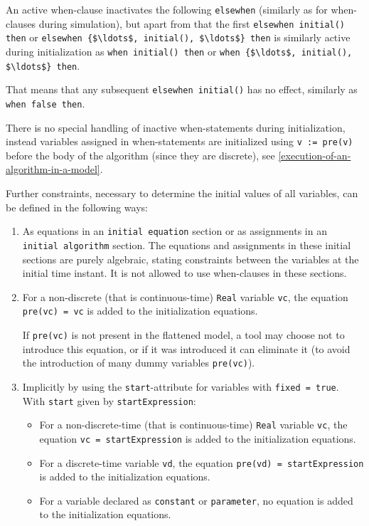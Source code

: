 An active when-clause inactivates the following \lstinline!elsewhen! (similarly as for when-clauses during simulation), but apart from that
the first \lstinline!elsewhen initial() then! or \lstinline!elsewhen {$\ldots$, initial(), $\ldots$} then! is similarly active during initialization as
\lstinline!when initial() then! or \lstinline!when {$\ldots$, initial(), $\ldots$} then!.

\begin{nonnormative}
That means that any subsequent \lstinline!elsewhen initial()! has no effect,
similarly as \lstinline!when false then!.
\end{nonnormative}

\begin{nonnormative}
There is no special handling of inactive when-statements during initialization, instead
variables assigned in when-statements are initialized using \lstinline!v := pre(v)!
before the body of the algorithm (since they are discrete), see \cref{execution-of-an-algorithm-in-a-model}.
\end{nonnormative}

Further constraints, necessary to determine the initial values of all
variables, can be defined in the following ways:
\begin{enumerate}
\item
  As equations in an \lstinline!initial equation! section or as assignments in an \lstinline!initial algorithm! section.
  The equations and assignments in these initial sections are purely algebraic, stating constraints between the variables at the initial time instant.
  It is not allowed to use when-clauses in these sections.
\item
  For a non-discrete (that is continuous-time) \lstinline!Real! variable \lstinline!vc!, the equation \lstinline!pre(vc) = vc! is added to the initialization equations.
  \begin{nonnormative}
  If \lstinline!pre(vc)! is not present in the flattened model, a tool may choose not to introduce this equation, or if it was introduced
  it can eliminate it (to avoid the introduction of many dummy variables \lstinline!pre(vc)!).
  \end{nonnormative}
\item
  Implicitly by using the \lstinline!start!-attribute for variables with \lstinline!fixed = true!.  With \lstinline!start! given by \lstinline!startExpression!:
  \begin{itemize}
  \item
    For a non-discrete-time (that is continuous-time) \lstinline!Real! variable \lstinline!vc!, the equation \lstinline!vc = startExpression! is added to the initialization equations.
  \item
    For a discrete-time variable \lstinline!vd!, the equation \lstinline!pre(vd) = startExpression! is added to the initialization equations.
  \item
    For a variable declared as \lstinline!constant! or \lstinline!parameter!, no equation is added to the initialization equations.
  \end{itemize}
\end{enumerate}

